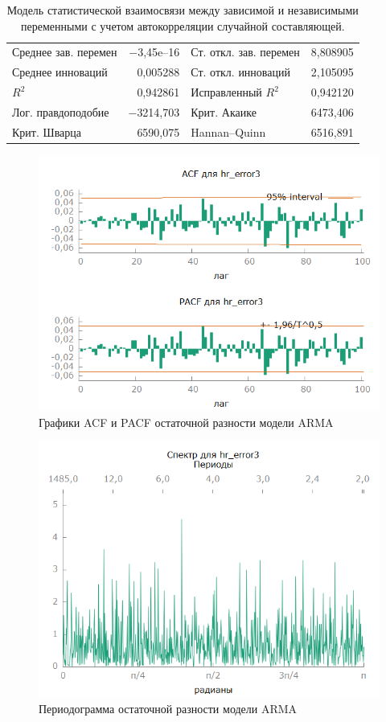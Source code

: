 \documentclass[a4paper,12pt]{article}
\begin{document}
\begin{table}[H]
\begin{center}
	\vspace{1ex}
	\begin{tabular}{lrlr}
		Среднее зав. перемен & $-$3,45\textrm{e--16} & Ст. откл. зав. перемен &  8,808905 \\
		Среднее инноваций &  0,005288 & Ст. откл. инноваций &  2,105095 \\
		$R^2$ &  0,942861 & Исправленный $R^2$ &  0,942120 \\
		Лог. правдоподобие & $-$3214,703 & Крит. Акаике &  6473,406 \\
		Крит. Шварца &  6590,075 & Hannan--Quinn &  6516,891 \\
	\end{tabular}	
\end{center}
\caption{Модель статистической взаимосвязи между зависимой и независимыми переменными с учетом автокорреляции случайной составляющей.}
\label{tab:table4}
\end{table}

\begin{figure}[H]
	\centering
	\includegraphics[width=0.5\linewidth]{../[graphics]/hr_error3_acf_100.png}
	\caption{Графики ACF и PACF остаточной разности модели ARMA}
	\label{fig:hr_error3_acf_100}
\end{figure}

\begin{figure}[H]
	\centering
	\includegraphics[width=0.5\linewidth]{../[graphics]/hr_error3_spectr.png}
	\caption{Периодограмма остаточной разности модели ARMA}
	\label{fig:hr_error3_spectr}
\end{figure}
\end{document}

